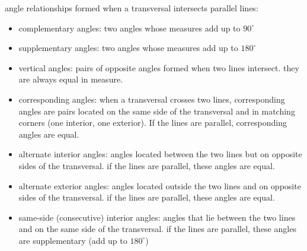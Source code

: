 \documentclass{article}
\begin{document}
angle relationships formed when a transversal intersects parallel lines:
	\begin{itemize}
		\item complementary angles: two angles whose measures add up to $90^{\circ}$
		\item supplementary angles: two angles whose measures add up to $180^{\circ}$
		\item vertical angles: pairs of opposite angles formed when two lines intersect. they are always equal in measure.
		\item corresponding angles: when a transversal crosses two lines, corresponding angles are pairs located on the same side of the transversal and in matching corners (one interior, one exterior). If the lines are parallel, corresponding angles are equal.
		\item alternate interior angles: angles located between the two lines but on opposite sides of the transversal. if the lines are parallel, these angles are equal.
		\item alternate exterior angles: angles located outside the two lines and on opposite sides of the transversal. if the lines are parallel, these angles are equal.
		\item same-side (consecutive) interior angles: angles that lie between the two lines and on the same side of the transversal. if the lines are parallel, these angles are supplementary (add up to $180^{\circ}$)
	\end{itemize}
\end{document}

